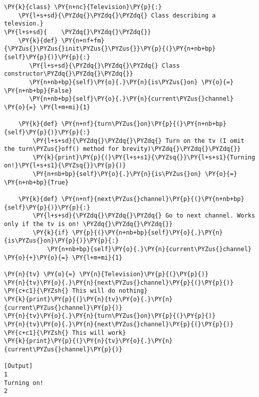\begin{Verbatim}[label=\makebox{\url{https://github.com/lucabaldini/cmepda/tree/master/slides/latex/snippets/class\_tv\_zapping.py}},commandchars=\\\{\}]
\PY{k}{class} \PY{n+nc}{Television}\PY{p}{:}
    \PY{l+s+sd}{\PYZdq{}\PYZdq{}\PYZdq{} Class describing a televsion.}
\PY{l+s+sd}{    \PYZdq{}\PYZdq{}\PYZdq{}}
    \PY{k}{def} \PY{n+nf+fm}{\PYZus{}\PYZus{}init\PYZus{}\PYZus{}}\PY{p}{(}\PY{n+nb+bp}{self}\PY{p}{)}\PY{p}{:}
       \PY{l+s+sd}{\PYZdq{}\PYZdq{}\PYZdq{} Class constructor\PYZdq{}\PYZdq{}\PYZdq{}}
       \PY{n+nb+bp}{self}\PY{o}{.}\PY{n}{is\PYZus{}on} \PY{o}{=} \PY{n+nb+bp}{False}
       \PY{n+nb+bp}{self}\PY{o}{.}\PY{n}{current\PYZus{}channel} \PY{o}{=} \PY{l+m+mi}{1}       
    
    \PY{k}{def} \PY{n+nf}{turn\PYZus{}on}\PY{p}{(}\PY{n+nb+bp}{self}\PY{p}{)}\PY{p}{:}
        \PY{l+s+sd}{\PYZdq{}\PYZdq{}\PYZdq{} Turn on the tv (I omit the turn\PYZus{}off() method for brevity)\PYZdq{}\PYZdq{}\PYZdq{}}
        \PY{k}{print}\PY{p}{(}\PY{l+s+s1}{\PYZsq{}}\PY{l+s+s1}{Turning on!}\PY{l+s+s1}{\PYZsq{}}\PY{p}{)}
        \PY{n+nb+bp}{self}\PY{o}{.}\PY{n}{is\PYZus{}on} \PY{o}{=} \PY{n+nb+bp}{True}

    \PY{k}{def} \PY{n+nf}{next\PYZus{}channel}\PY{p}{(}\PY{n+nb+bp}{self}\PY{p}{)}\PY{p}{:}
        \PY{l+s+sd}{\PYZdq{}\PYZdq{}\PYZdq{} Go to next channel. Works only if the tv is on! \PYZdq{}\PYZdq{}\PYZdq{}}
        \PY{k}{if} \PY{p}{(}\PY{n+nb+bp}{self}\PY{o}{.}\PY{n}{is\PYZus{}on}\PY{p}{)}\PY{p}{:}
            \PY{n+nb+bp}{self}\PY{o}{.}\PY{n}{current\PYZus{}channel} \PY{o}{+}\PY{o}{=} \PY{l+m+mi}{1}

\PY{n}{tv} \PY{o}{=} \PY{n}{Television}\PY{p}{(}\PY{p}{)}
\PY{n}{tv}\PY{o}{.}\PY{n}{next\PYZus{}channel}\PY{p}{(}\PY{p}{)} \PY{c+c1}{\PYZsh{} This will do nothing}
\PY{k}{print}\PY{p}{(}\PY{n}{tv}\PY{o}{.}\PY{n}{current\PYZus{}channel}\PY{p}{)}
\PY{n}{tv}\PY{o}{.}\PY{n}{turn\PYZus{}on}\PY{p}{(}\PY{p}{)}
\PY{n}{tv}\PY{o}{.}\PY{n}{next\PYZus{}channel}\PY{p}{(}\PY{p}{)} \PY{c+c1}{\PYZsh{} This will work}
\PY{k}{print}\PY{p}{(}\PY{n}{tv}\PY{o}{.}\PY{n}{current\PYZus{}channel}\PY{p}{)}

[Output]
1
Turning on!
2
\end{Verbatim}